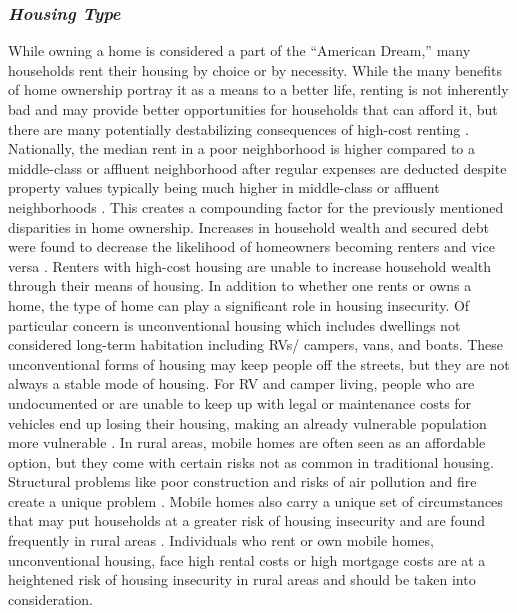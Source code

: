 
 

\subsubsection{\textit{Housing Type}}  

 

While owning a home is considered a part of the “American Dream,” many households rent their housing by choice or by necessity. While the many benefits of home ownership portray it as a means to a better life, renting is not inherently bad and may provide better opportunities for households that can afford it, but there are many potentially destabilizing consequences of high-cost renting \citep{drew_believing_2014}. Nationally, the median rent in a poor neighborhood is higher compared to a middle-class or affluent neighborhood after regular expenses are deducted despite property values typically being much higher in middle-class or affluent neighborhoods \citep{desmond_poor_2019}. This creates a compounding factor for the previously mentioned disparities in home ownership. Increases in household wealth and secured debt were found to decrease the likelihood of homeowners becoming renters and vice versa \citep{anderson_effect_2021}. Renters with high-cost housing are unable to increase household wealth through their means of housing. In addition to whether one rents or owns a home, the type of home can play a significant role in housing insecurity. Of particular concern is unconventional housing which includes dwellings not considered long-term habitation including RVs/ campers, vans, and boats. These unconventional forms of housing may keep people off the streets, but they are not always a stable mode of housing. For RV and camper living, people who are undocumented or are unable to keep up with legal or maintenance costs for vehicles end up losing their housing, making an already vulnerable population more vulnerable \citep{wakin_not_2005}. In rural areas, mobile homes are often seen as an affordable option, but they come with certain risks not as common in traditional housing. Structural problems like poor construction and risks of air pollution and fire create a unique problem \citep{mactavish_policy_2006}. Mobile homes also carry a unique set of circumstances that may put households at a greater risk of housing insecurity and are found frequently in rural areas \citep{mactavish_wrong_2007}. Individuals who rent or own mobile homes, unconventional housing, face high rental costs or high mortgage costs are at a heightened risk of housing insecurity in rural areas and should be taken into consideration.  


